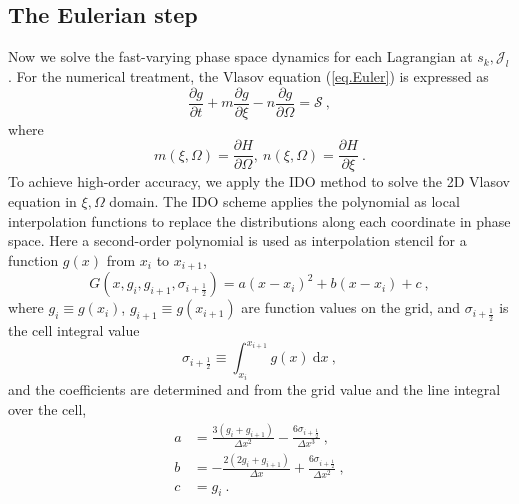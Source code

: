 \subsection{The Eulerian step}
Now we solve the fast-varying phase space dynamics for each Lagrangian at $s_k,\mathcal{J}_l$.
For the numerical treatment, the Vlasov equation (\ref{eq.Euler}) is expressed as
\begin{equation}\label{eq.Euler2}
    \frac{\partial g}{\partial t} + m \frac{\partial  g}{\partial \xi} - n \frac{\partial  g}{\partial \Omega}= \mathcal{S}~,
\end{equation}
where 
\begin{equation}
        m(\xi,\Omega) = \frac{\partial H}{\partial \Omega},~ n(\xi,\Omega) = \frac{\partial H}{\partial \xi}~.
\end{equation}
To achieve high-order accuracy, we apply the IDO method \cite{imadera2009} to solve the 2D Vlasov equation in $\xi,\Omega$ domain.
The IDO scheme applies the polynomial as local interpolation functions to replace the distributions along each coordinate in phase space. 
Here
a second-order  polynomial is used as interpolation stencil for a function $g(x)$ from $x_i$ to $x_{i+1}$,
\begin{equation}\label{eq.intg}
    G(x,g_{i},g_{i+1},\sigma_{i+\frac{1}{2}}) = a\left(x-x_i\right)^2+b\left(x-x_i\right)+c~,
\end{equation}
where $g_i \equiv g(x_i)$, $g_{i+1} \equiv g(x_{i+1})$ are function values on the grid, and $\sigma_{i+\frac{1}{2}}$ is the cell integral value 
\begin{equation}
    \sigma_{i+\frac{1}{2}} \equiv \int_{x_i}^{x_{i+1}} g(x)~\mathrm{d}x~,
\end{equation}
and the coefficients are determined and from the grid value and the line integral over the cell,
\begin{equation}
    \begin{aligned}
        a & =\frac{3\left(g_i+g_{i+1}\right)}{\Delta x^2}-\frac{6 \sigma_{i+\frac{1}{2}}}{\Delta x^3}~, \\
        b & =-\frac{2\left(2 g_i+g_{i+1}\right)}{\Delta x}+\frac{6 \sigma_{i+\frac{1}{2}}}{\Delta x^2}~, \\
        c & = g_i~.
    \end{aligned}
\end{equation}

